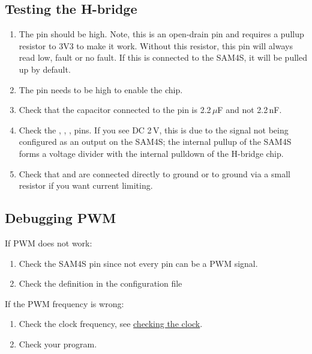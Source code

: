 \subsection{Testing the H-bridge}
\label{testing-the-h-bridge}

\begin{enumerate}
\item The  pin should be high.  Note, this is an
  open-drain pin and requires a pullup resistor to 3V3 to make it
  work.  Without this resistor, this pin will always read low, fault
  or no fault.  If this is connected to the SAM4S, it will be pulled
  up by default.

\item The  pin needs to be high to enable the chip.

\item Check that the capacitor connected to the  pin is
  2.2\,$\mu$F and not 2.2\,nF.

\item Check the , , ,  pins.
  If you see DC 2\,V, this is due to the signal not being configured
  as an output on the SAM4S; the internal pullup of the SAM4S forms a
  voltage divider with the internal pulldown of the H-bridge chip.

\item Check that  and  are connected
  directly to ground or to ground via a small resistor if you want
  current limiting.
\end{enumerate}


\subsection{Debugging PWM}
\label{debugging-pwm}

If PWM does not work:

\begin{enumerate}
\item
  Check the SAM4S pin since not every pin can be a PWM signal.
\item
  Check the definition in the configuration file 
\end{enumerate}

If the PWM frequency is wrong:

\begin{enumerate}
\item
  Check the clock frequency, see
  \hyperref[checking-the-clock]{checking the clock}.
\item
  Check your program.
\end{enumerate}

